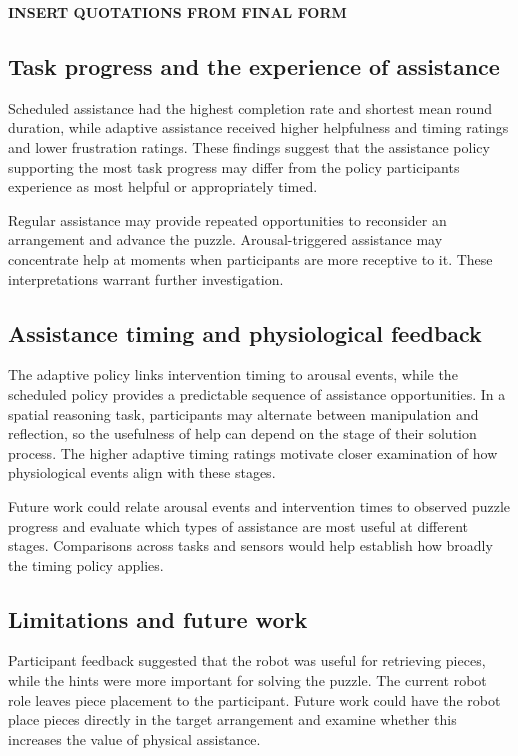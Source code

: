 \documentclass[sigconf]{aamas}
\begin{document}
\textbf{INSERT QUOTATIONS FROM FINAL FORM}

\subsection{Task progress and the experience of assistance}

Scheduled assistance had the highest completion rate and shortest mean round duration, while adaptive assistance received higher helpfulness and timing ratings and lower frustration ratings. These findings suggest that the assistance policy supporting the most task progress may differ from the policy participants experience as most helpful or appropriately timed.

Regular assistance may provide repeated opportunities to reconsider an arrangement and advance the puzzle. Arousal-triggered assistance may concentrate help at moments when participants are more receptive to it. These interpretations warrant further investigation.

\subsection{Assistance timing and physiological feedback}

The adaptive policy links intervention timing to arousal events, while the scheduled policy provides a predictable sequence of assistance opportunities. In a spatial reasoning task, participants may alternate between manipulation and reflection, so the usefulness of help can depend on the stage of their solution process. The higher adaptive timing ratings motivate closer examination of how physiological events align with these stages.

Future work could relate arousal events and intervention times to observed puzzle progress and evaluate which types of assistance are most useful at different stages. Comparisons across tasks and sensors would help establish how broadly the timing policy applies.

\subsection{Limitations and future work}

Participant feedback suggested that the robot was useful for retrieving pieces, while the hints were more important for solving the puzzle. The current robot role leaves piece placement to the participant. Future work could have the robot place pieces directly in the target arrangement and examine whether this increases the value of physical assistance.
\end{document}
